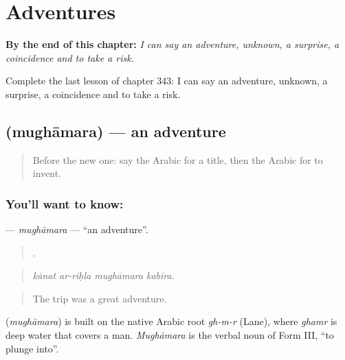 
\chapter{Adventures}
\label{ch:ar-adventures}

\begin{chapteropening}
\textbf{By the end of this chapter:} \emph{I can say an adventure, unknown, a surprise, a coincidence and to take a risk.}

Complete the last lesson of chapter 343: I can say an adventure, unknown, a surprise, a coincidence and to take a risk.
\end{chapteropening}

\section[\texorpdfstring{\ar{مغامرة} (mughāmara)}{مغامرة (mughāmara)}]{ (mughāmara) — an adventure}

\label{lesson:AR-C343-mughamara}



\begin{quote}
Before the new one: say the Arabic for a title, then the Arabic for to invent.
\end{quote}

\subsection*{You'll want to know: }
\textbf{} — \emph{mughāmara} — \textquotedblleft{}an adventure\textquotedblright{}.

\begin{quote}
   .
\end{quote}

\begin{quote}
\emph{kānat ar-riḥla mughāmara kabīra.}
\end{quote}

\begin{quote}
The trip was a great adventure.
\end{quote}

\begin{cousinweb}
\textbf{} (\emph{mughāmara}) is built on the native Arabic root \emph{gh-m-r} (Lane), where \emph{ghamr} is deep water that covers a man. \emph{Mughāmara} is the verbal noun of Form III, \textquotedblleft{}to plunge into\textquotedblright{}.
\end{cousinweb}

